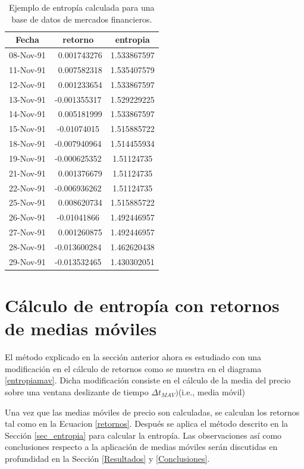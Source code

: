 \begin{table}
	\begin{center}
	\begin{tabular}{|c|c|c|}
		\hline 
		Fecha & retorno & entropia \\ 
		\hline 
08-Nov-91	&	~0.001743276	&	1.533867597	\\
11-Nov-91	&	~0.007582318	&	1.535407579	\\
12-Nov-91	&	~0.001233654	&	1.533867597	\\
13-Nov-91	&	-0.001355317	&	1.529229225	\\
14-Nov-91	&	~0.005181999	&	1.533867597	\\
15-Nov-91	&	-0.01074015	&	1.515885722	\\
18-Nov-91	&	-0.007940964	&	1.514455934	\\
19-Nov-91	&	-0.000625352	&	1.51124735	\\
21-Nov-91	&	~0.001376679	&	1.51124735	\\
22-Nov-91	&	-0.006936262	&	1.51124735	\\
25-Nov-91	&	~0.008620734	&	1.515885722	\\
26-Nov-91	&	-0.01041866	&	1.492446957	\\
27-Nov-91	&	~0.001260875	&	1.492446957	\\
28-Nov-91	&	-0.013600284	&	1.462620438	\\
29-Nov-91	&	-0.013532465	&	1.430302051	\\
		\hline 
	\end{tabular} 
	\label{entropytable}
	\caption{Ejemplo de entropía calculada para una base de datos de mercados financieros.}
\end{center}
\end{table}




\section{Cálculo de entropía con retornos de medias móviles}
\label{metodo_MAV}
El método explicado en la sección anterior ahora es estudiado con una modificación en el cálculo de retornos como se muestra en el diagrama \ref{entropiamav}.
Dicha modificación consiste en el cálculo de la media del precio sobre una ventana deslizante de tiempo $\Delta t_{MAV})$(i.e., media móvil) 

Una vez que las medias móviles de precio son calculadas, se calculan los retornos tal como en la Ecuacion \ref{retornos}.
Después se aplica el método descrito en la Sección \ref{sec_entropia} para calcular la entropía.
Las observaciones así como conclusiones respecto a la aplicación de medias móviles serán discutidas en profundidad en la Sección \ref{Resultados} y \ref{Conclusiones}.


